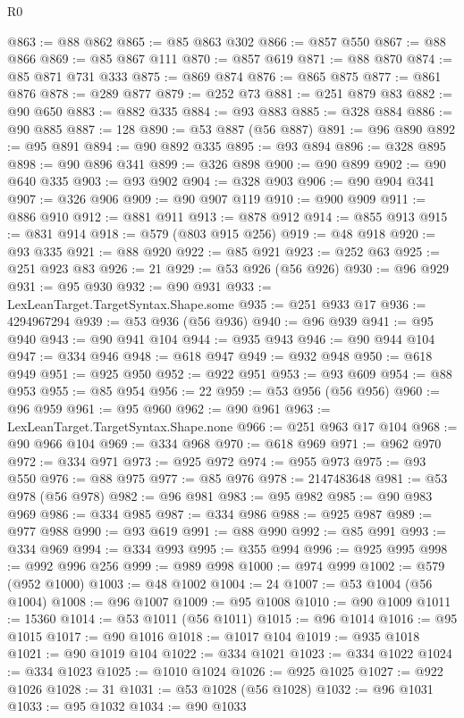 \begin{lexlean}{R0}
\begin{coremodule}
@863 := @88 @862
@865 := @85 @863 @302
@866 := @857 @550
@867 := @88 @866
@869 := @85 @867 @111
@870 := @857 @619
@871 := @88 @870
@874 := @85 @871 @731 @333
@875 := @869 @874
@876 := @865 @875
@877 := @861 @876
@878 := @289 @877
@879 := @252 @73
@881 := @251 @879 @83
@882 := @90 @650
@883 := @882 @335
@884 := @93 @883
@885 := @328 @884
@886 := @90 @885
@887 := 128
@890 := @53 @887 (@56 @887)
@891 := @96 @890
@892 := @95 @891
@894 := @90 @892 @335
@895 := @93 @894
@896 := @328 @895
@898 := @90 @896 @341
@899 := @326 @898
@900 := @90 @899
@902 := @90 @640 @335
@903 := @93 @902
@904 := @328 @903
@906 := @90 @904 @341
@907 := @326 @906
@909 := @90 @907 @119
@910 := @900 @909
@911 := @886 @910
@912 := @881 @911
@913 := @878 @912
@914 := @855 @913
@915 := @831 @914
@918 := @579 (@803 @915 @256)
@919 := @48 @918
@920 := @93 @335
@921 := @88 @920
@922 := @85 @921
@923 := @252 @63
@925 := @251 @923 @83
@926 := 21
@929 := @53 @926 (@56 @926)
@930 := @96 @929
@931 := @95 @930
@932 := @90 @931
@933 := LexLeanTarget.TargetSyntax.Shape.some
@935 := @251 @933 @17
@936 := 4294967294
@939 := @53 @936 (@56 @936)
@940 := @96 @939
@941 := @95 @940
@943 := @90 @941 @104
@944 := @935 @943
@946 := @90 @944 @104
@947 := @334 @946
@948 := @618 @947
@949 := @932 @948
@950 := @618 @949
@951 := @925 @950
@952 := @922 @951
@953 := @93 @609
@954 := @88 @953
@955 := @85 @954
@956 := 22
@959 := @53 @956 (@56 @956)
@960 := @96 @959
@961 := @95 @960
@962 := @90 @961
@963 := LexLeanTarget.TargetSyntax.Shape.none
@966 := @251 @963 @17 @104
@968 := @90 @966 @104
@969 := @334 @968
@970 := @618 @969
@971 := @962 @970
@972 := @334 @971
@973 := @925 @972
@974 := @955 @973
@975 := @93 @550
@976 := @88 @975
@977 := @85 @976
@978 := 2147483648
@981 := @53 @978 (@56 @978)
@982 := @96 @981
@983 := @95 @982
@985 := @90 @983 @969
@986 := @334 @985
@987 := @334 @986
@988 := @925 @987
@989 := @977 @988
@990 := @93 @619
@991 := @88 @990
@992 := @85 @991
@993 := @334 @969
@994 := @334 @993
@995 := @355 @994
@996 := @925 @995
@998 := @992 @996 @256
@999 := @989 @998
@1000 := @974 @999
@1002 := @579 (@952 @1000)
@1003 := @48 @1002
@1004 := 24
@1007 := @53 @1004 (@56 @1004)
@1008 := @96 @1007
@1009 := @95 @1008
@1010 := @90 @1009
@1011 := 15360
@1014 := @53 @1011 (@56 @1011)
@1015 := @96 @1014
@1016 := @95 @1015
@1017 := @90 @1016
@1018 := @1017 @104
@1019 := @935 @1018
@1021 := @90 @1019 @104
@1022 := @334 @1021
@1023 := @334 @1022
@1024 := @334 @1023
@1025 := @1010 @1024
@1026 := @925 @1025
@1027 := @922 @1026
@1028 := 31
@1031 := @53 @1028 (@56 @1028)
@1032 := @96 @1031
@1033 := @95 @1032
@1034 := @90 @1033

\end{coremodule}
\end{lexlean}
